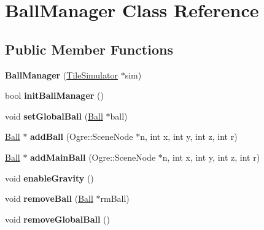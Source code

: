 \hypertarget{classBallManager}{\section{Ball\-Manager Class Reference}
\label{classBallManager}
}
\subsection*{Public Member Functions}
\begin{DoxyCompactItemize}
\item 
\hypertarget{classBallManager_a63b25d78645bea88f1d9742254f92305}{{\bfseries Ball\-Manager} (\hyperlink{classTileSimulator}{Tile\-Simulator} $\ast$sim)}\label{classBallManager_a63b25d78645bea88f1d9742254f92305}

\item 
\hypertarget{classBallManager_af6eb7ce1ec14906c50ab69fa46eb8b11}{bool {\bfseries init\-Ball\-Manager} ()}\label{classBallManager_af6eb7ce1ec14906c50ab69fa46eb8b11}

\item 
\hypertarget{classBallManager_a7e16e93759654ab1511acf0696e49d44}{void {\bfseries set\-Global\-Ball} (\hyperlink{classBall}{Ball} $\ast$ball)}\label{classBallManager_a7e16e93759654ab1511acf0696e49d44}

\item 
\hypertarget{classBallManager_a0391fe48835ab1816ef8f180ff8b42eb}{\hyperlink{classBall}{Ball} $\ast$ {\bfseries add\-Ball} (Ogre\-::\-Scene\-Node $\ast$n, int x, int y, int z, int r)}\label{classBallManager_a0391fe48835ab1816ef8f180ff8b42eb}

\item 
\hypertarget{classBallManager_a1eed74d1d8c6070187774fd23f79fa91}{\hyperlink{classBall}{Ball} $\ast$ {\bfseries add\-Main\-Ball} (Ogre\-::\-Scene\-Node $\ast$n, int x, int y, int z, int r)}\label{classBallManager_a1eed74d1d8c6070187774fd23f79fa91}

\item 
\hypertarget{classBallManager_a318d172c88d6e423c1d3f8dc3d5d9557}{void {\bfseries enable\-Gravity} ()}\label{classBallManager_a318d172c88d6e423c1d3f8dc3d5d9557}

\item 
\hypertarget{classBallManager_aa79158dcf4c003391de0fe8750a6d0ab}{void {\bfseries remove\-Ball} (\hyperlink{classBall}{Ball} $\ast$rm\-Ball)}\label{classBallManager_aa79158dcf4c003391de0fe8750a6d0ab}

\item 
\hypertarget{classBallManager_a03aa05fe5f1a7badf3028a2749596eb1}{void {\bfseries remove\-Global\-Ball} ()}\label{classBallManager_a03aa05fe5f1a7badf3028a2749596eb1}


\end{DoxyCompactItemize}
